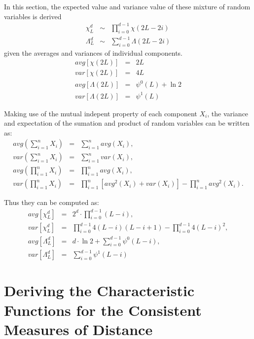 \documentclass[journal]{IEEEtran}
\begin{document}
In this section, the expected value and variance value of these mixture of random variables is derived
\begin{eqnarray}
\chi^d_L &\sim& \prod_{i=0}^{d-1} \chi (2L-2i) \\
\Lambda^d_L &\sim& \sum_{i=0}^{d-1} \Lambda (2L-2i)
\end{eqnarray}
given the averages and variances of individual components.
\begin{eqnarray}
avg \left[ \chi(2L) \right]&=&2L \\
var \left[ \chi(2L) \right]&=&4L \\
avg \left[ \Lambda(2L) \right] &=& \psi^0(L) + \ln2 \\
var \left[ \Lambda(2L) \right] &=& \psi^1(L)
\end{eqnarray}

Making use of the mutual indepent property of each component $X_i$,
  the variance and expectation of the sumation and product of random variables can be written as:
\begin{eqnarray*}
avg \left( \sum^n_{i=1} X_i \right) &=& \sum^n_{i=1} avg(X_i), \\
var \left( \sum^n_{i=1} X_i \right) &=& \sum^n_{i=1} var(X_i), \\
avg \left( \prod^n_{i=1} X_i \right) &=& \prod^n_{i=1} avg(X_i), \\ 
var \left( \prod^n_{i=1} X_i \right) &=& \prod^n_{i=1} \left[ avg^2(X_i) + var(X_i) \right] - \prod^n_{i=1} avg^2(X_i).    
\end{eqnarray*}

Thus they can be computed as:
\begin{eqnarray*}
  avg \left[ \chi^d_L \right] &=& 2^d \cdot \prod^{d-1}_{i=0} (L-i), \\
  var \left[ \chi^d_L \right] &=& \prod^{d-1}_{i=0} 4(L-i)(L-i+1) - \prod^{d-1}_{i=0} 4(L-i)^2, \\
  avg \left[ \Lambda^d_L \right] &=& d \cdot \ln{2} + \sum^{d-1}_{i=0} \psi^0(L-i), \\
  var \left[ \Lambda^d_L \right] &=& \sum^{d-1}_{i=0} \psi^1(L-i)
\end{eqnarray*}

\section{Deriving the Characteristic Functions for the Consistent Measures of Distance}
\label{sec:appendix_b}
\end{document}
